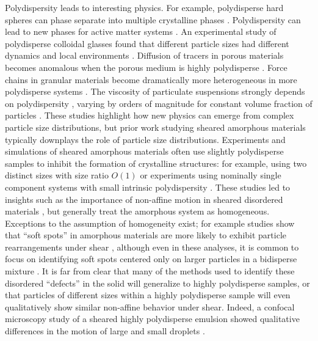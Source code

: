 \documentclass[%
 reprint,
 amsmath,amssymb,
 aps,
]{revtex4-2}
\begin{document}
Polydispersity leads to interesting physics.  For example, polydisperse hard spheres can phase separate into multiple crystalline phases \cite{sollich10}.  Polydispersity can lead to new phases for active matter systems \cite{kumar21}.  An experimental study of polydisperse colloidal glasses found that different particle sizes had different dynamics and local environments \cite{heckendorf17}.  Diffusion of tracers in porous materials becomes anomalous when the porous medium is highly polydisperse \cite{cho12}.  Force chains in granular materials become dramatically more heterogeneous in more polydisperse systems \cite{nguyen14,nguyen15,cantor18}.  The viscosity of particulate suspensions strongly depends on polydispersity \cite{pednekar18}, varying by orders of magnitude for constant volume fraction of particles \cite{chong71}.  These studies highlight how new physics can emerge from complex particle size distributions, but prior work studying sheared amorphous materials typically downplays the role of particle size distributions.  Experiments and simulations of sheared amorphous materials often use slightly polydisperse samples to inhibit the formation of crystalline structures:  for example, using two distinct sizes with size ratio $O(1)$ \cite{yamamoto97,falk98,teitel07,utter08,lemaitre09,manning11,cubuk15,hassani19} or experiments using nominally single component systems with small intrinsic polydispersity \cite{liu96,mason97emulsions,hebraud97,petekidis02,schall07,chen10,vasisht18,tsai21}.  These studies led to insights such as the importance of non-affine motion in sheared disordered materials \cite{falk98,utter08,schall07}, but generally treat the amorphous system as homogeneous.  Exceptions to the assumption of homogeneity exist; for example studies show that ``soft spots'' in amorphous materials are more likely to exhibit particle rearrangements under shear \cite{manning11}, although even in these analyses, it is common to focus on identifying soft spots centered only on larger particles in a bidisperse mixture \cite{cubuk15,schoenholz16,bapst2020unveiling}. It is far from clear that many of the methods used to identify these disordered ``defects'' in the solid will generalize to highly polydisperse samples, or that particles of different sizes within a highly polydisperse sample will even qualitatively show similar non-affine behavior under shear.  Indeed, a confocal microscopy study of a sheared highly polydisperse emulsion showed qualitative differences in the motion of large and small droplets \cite{clararahola15}.
\end{document}
